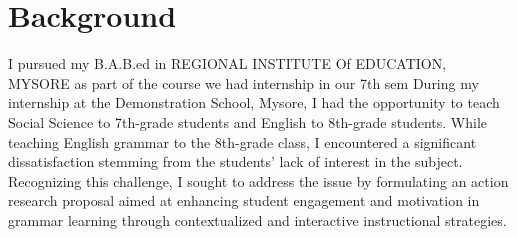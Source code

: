 \documentclass[12pt, a4paaper]{article}
\begin{document}
 

\newpage 
\section{Background}   
 I pursued my B.A.B.ed in REGIONAL INSTITUTE Of EDUCATION, MYSORE as part of the course we had internship in our 7th sem During my internship at the Demonstration School, Mysore,  I had the opportunity to teach Social Science to 7th-grade students and English to 8th-grade students. While teaching English grammar to the 8th-grade class, I encountered a significant dissatisfaction stemming from the students' lack of interest in the subject.  Recognizing this challenge, I sought to address the issue by formulating an action research proposal aimed at enhancing student engagement and motivation in grammar learning through contextualized and interactive instructional strategies. 
\end{document}

